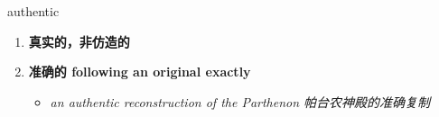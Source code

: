 
\begin{frame}
{\huge authentic}
\begin{center}
\begin{enumerate}\Large
  \item \textbf{真实的，非仿造的}
  \item \textbf{准确的 following an original exactly}
  \begin{itemize}
    \item \em{\Large{an authentic reconstruction of the Parthenon 帕台农神殿的准确复制}}
  \end{itemize}
\end{enumerate}
\end{center}
\end{frame}
